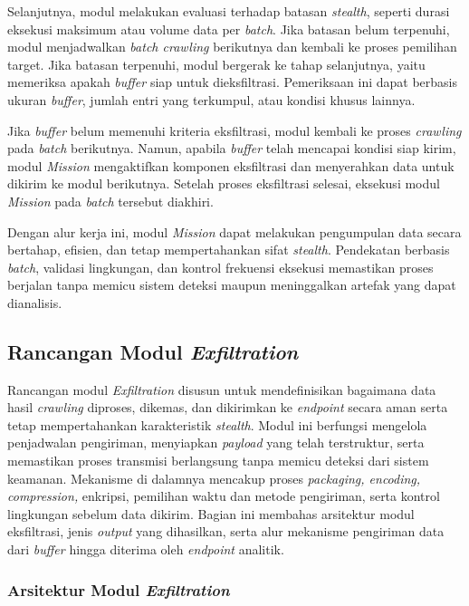 Selanjutnya, modul melakukan evaluasi terhadap batasan \textit{stealth}, seperti durasi eksekusi 
maksimum atau volume data per \textit{batch}. Jika batasan belum terpenuhi, modul menjadwalkan 
\textit{batch crawling} berikutnya dan kembali ke proses pemilihan target. Jika batasan terpenuhi, 
modul bergerak ke tahap selanjutnya, yaitu memeriksa apakah \textit{buffer} siap untuk 
dieksfiltrasi. Pemeriksaan ini dapat berbasis ukuran \textit{buffer}, jumlah entri yang terkumpul, 
atau kondisi khusus lainnya.

Jika \textit{buffer} belum memenuhi kriteria eksfiltrasi, modul kembali ke proses \textit{crawling} 
pada \textit{batch} berikutnya. Namun, apabila \textit{buffer} telah mencapai kondisi siap kirim, 
modul \textit{Mission} mengaktifkan komponen eksfiltrasi dan menyerahkan data untuk dikirim ke modul 
berikutnya. Setelah proses eksfiltrasi selesai, eksekusi modul \textit{Mission} pada \textit{batch} 
tersebut diakhiri.

Dengan alur kerja ini, modul \textit{Mission} dapat melakukan pengumpulan data secara bertahap, 
efisien, dan tetap mempertahankan sifat \textit{stealth}. Pendekatan berbasis \textit{batch}, 
validasi lingkungan, dan kontrol frekuensi eksekusi memastikan proses berjalan tanpa memicu sistem 
deteksi maupun meninggalkan artefak yang dapat dianalisis.

\subsection{Rancangan Modul \textit{Exfiltration}}
\label{subsec:rancangan-exfiltration}

Rancangan modul \textit{Exfiltration} disusun untuk mendefinisikan bagaimana data hasil 
\textit{crawling} diproses, dikemas, dan dikirimkan ke \textit{endpoint} secara aman serta 
tetap mempertahankan karakteristik \textit{stealth}. Modul ini berfungsi mengelola 
penjadwalan pengiriman, menyiapkan \textit{payload} yang telah terstruktur, serta 
memastikan proses transmisi berlangsung tanpa memicu deteksi dari sistem keamanan. 
Mekanisme di dalamnya mencakup proses \textit{packaging, encoding, compression,} enkripsi, pemilihan 
waktu dan metode pengiriman, serta kontrol lingkungan sebelum data dikirim. Bagian ini membahas 
arsitektur modul eksfiltrasi, jenis \textit{output} yang dihasilkan, serta alur mekanisme 
pengiriman data dari \textit{buffer} hingga diterima oleh \textit{endpoint} analitik.

\subsubsection{Arsitektur Modul \textit{Exfiltration}}
\label{subsubsec:arsitektur-exfiltration}

